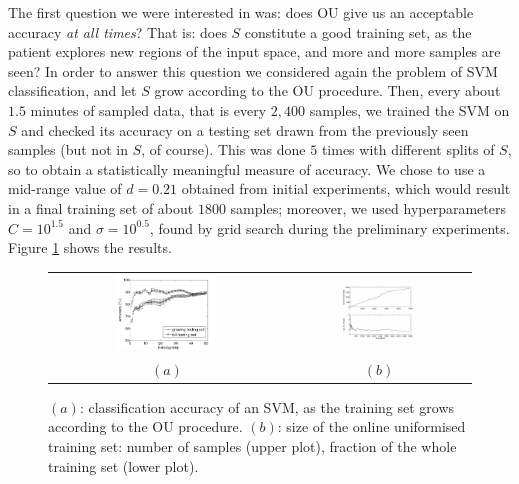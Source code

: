 The first question we were interested in was: does OU give us an
acceptable accuracy \emph{at all times}? That is: does $S$ constitute
a good training set, as the patient explores new regions of the input
space, and more and more samples are seen? In order to answer this
question we considered again the problem of SVM classification, and
let $S$ grow according to the OU procedure. Then, every about $1.5$
minutes of sampled data, that is every $2,400$ samples, we trained the
SVM on $S$ and checked its accuracy on a testing set drawn from the
previously seen samples (but not in $S$, of course). This was done $5$
times with different splits of $S$, so to obtain a statistically
meaningful measure of accuracy. We chose to use a mid-range value of
$d = 0.21$ obtained from initial experiments, which would
result in a final training set of about $1800$ samples; moreover, we
used hyperparameters $C = 10^{1.5}$ and $\sigma = 10^{0.5}$, found by
grid search during the preliminary experiments. Figure \ref{fig:inc}
shows the results.

\begin{figure}[!ht] \centering
  \begin{tabular}{cc}
    \includegraphics[width=0.45\textwidth]{figs/fig_resInc_OU21.png} &
    \includegraphics[width=0.45\textwidth]{figs/fig_growth_OU21.png} \\
    $(a)$ & $(b)$ \\
  \end{tabular}
  \caption{$(a)$: classification accuracy of an SVM, as the training set
    grows according to the OU procedure. $(b)$:
    size of the online uniformised training set: number of samples
    (upper plot), fraction of the whole training set (lower plot).}
  \label{fig:inc}
\end{figure}

